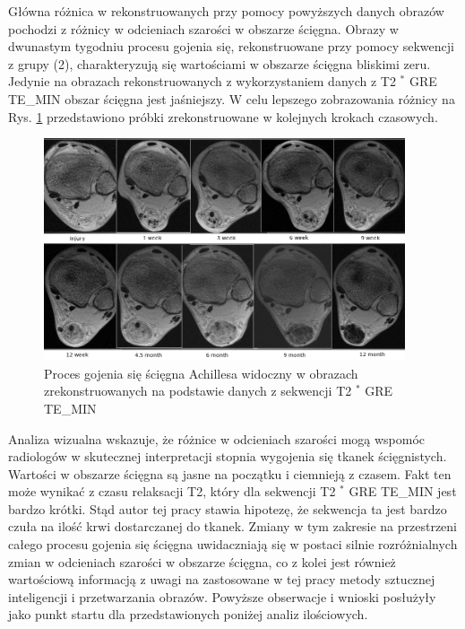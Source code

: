 Główna różnica w rekonstruowanych przy pomocy powyższych danych obrazów pochodzi z różnicy w odcieniach szarości w obszarze ścięgna. Obrazy w dwunastym tygodniu procesu gojenia się, rekonstruowane przy pomocy sekwencji z grupy (2), charakteryzują się wartościami w obszarze ścięgna bliskimi zeru. Jedynie na obrazach rekonstruowanych z wykorzystaniem danych z T2 $^\ast$ GRE TE\_MIN obszar ścięgna jest jaśniejszy. W celu lepszego zobrazowania różnicy na Rys. \ref{fig:T2comp} przedstawiono próbki zrekonstruowane w kolejnych krokach czasowych.

\begin{figure}[h]
	\centering
	\includegraphics[width=0.95\textwidth]{figures/T2gremin.png}
	\caption{Proces gojenia się ścięgna Achillesa widoczny w obrazach zrekonstruowanych na podstawie danych z sekwencji T2 $^\ast$ GRE TE\_MIN}\label{fig:T2comp}
\end{figure}

Analiza wizualna wskazuje, że różnice w odcieniach szarości mogą wspomóc radiologów w skutecznej interpretacji stopnia wygojenia się tkanek ścięgnistych. Wartości w obszarze ścięgna są jasne na początku i ciemnieją z czasem. Fakt ten może wynikać z czasu relaksacji T2, który dla sekwencji T2 $^\ast$ GRE TE\_MIN jest bardzo krótki. Stąd autor tej pracy stawia hipotezę, że sekwencja ta jest bardzo czuła na ilość krwi dostarczanej do tkanek. Zmiany w tym zakresie na przestrzeni całego procesu gojenia się ścięgna uwidaczniają się w postaci silnie rozróżnialnych zmian w odcieniach szarości w obszarze ścięgna, co z kolei jest również wartościową informacją z uwagi na zastosowane w tej pracy metody sztucznej inteligencji i przetwarzania obrazów. Powyższe obserwacje i wnioski posłużyły jako punkt startu dla przedstawionych poniżej analiz ilościowych.

